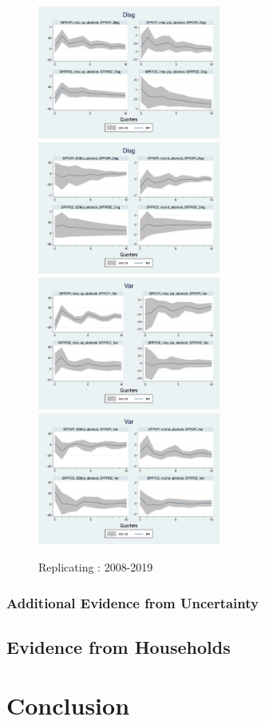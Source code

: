 \documentclass[]{article}
\begin{document}
\begin{figure}[h]
	\smallskip
	\includegraphics[width=6cm]{figures/SPFDisg_ab_ashocks_nmp_post2007.png} 
	\includegraphics[width=6cm]{figures/SPFDisg_ab_ashocks_post2007.png} \\
	\smallskip 
		\includegraphics[width=6cm]{figures/SPFVar_ab_ashocks_nmp_post2007.png} 
	\includegraphics[width=6cm]{figures/SPFVar_ab_ashocks_post2007.png} 
	\caption{ Replicating \cite{coibion2012can}: 2008-2019}
\end{figure}



\subsubsection{Additional Evidence from Uncertainty}

\subsection{Evidence from Households}

\section{Conclusion}




\end{document}
